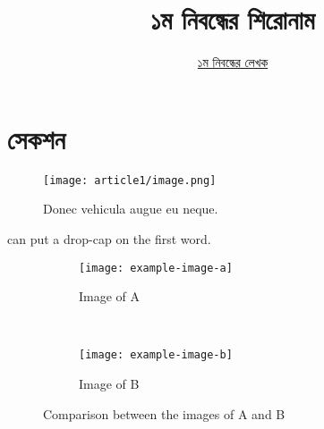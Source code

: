 \documentclass[12pt]{article}
\begin{document}

\title{১ম নিবন্ধের শিরোনাম}
\author{\href{https://github.com/rafisics/ebook-template}{১ম নিবন্ধের লেখক}}
\date{}


\section{সেকশন}

\begin{figure}[hbt!]
        \centering
        \texttt{[image: article1/image.png]}
        \caption{Donec vehicula augue eu neque.}
\end{figure}

 can put a drop-cap on the first word.
\lipsum

\begin{figure}[hbt!]
    \centering
    \begin{subfigure}[t]{0.5\textwidth}
        \centering
        \texttt{[image: example-image-a]}
        \caption{Image of A}
    \end{subfigure}%
    ~
    \begin{subfigure}[t]{0.5\textwidth}
        \centering
        \texttt{[image: example-image-b]}
        \caption{Image of B}
    \end{subfigure}
    \caption{Comparison between the images of A and B}
\end{figure}



\end{document}
